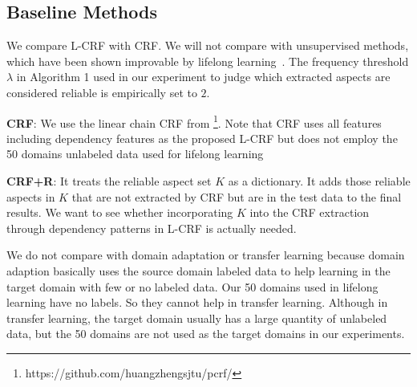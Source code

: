 \documentclass[11pt,a4paper]{article}
\theoremstyle{definition}
\begin{document}
\subsection{Baseline Methods} %
    We compare L-CRF with CRF. We will not compare with unsupervised methods, which have been shown improvable by lifelong learning~\cite{ChenZhiyuan2014ACL,liu2016improving}. The frequency threshold $\lambda$ in Algorithm 1 used in our experiment to judge which extracted aspects are considered reliable is empirically set to $2$.    
    
    {\bf CRF}: We use the linear chain CRF from  \footnote{https://github.com/huangzhengsjtu/pcrf/}. Note that CRF uses all features including dependency features as the proposed L-CRF but does not employ the 50 domains unlabeled data used for lifelong learning
    
    {\bf CRF+R}: It treats the reliable aspect set $K$ as a dictionary. It adds those reliable aspects in $K$ that are not extracted by CRF but are in the test data to the final results. We want to see whether incorporating $K$ into the CRF extraction through dependency patterns in L-CRF is actually needed.     

We do not compare with domain adaptation or transfer learning because domain adaption basically uses the source domain labeled data to help learning in the target domain with few or no labeled data. Our 50 domains used in lifelong learning have no labels. So they cannot help in transfer learning. Although in transfer learning, the target domain usually has a large quantity of unlabeled data, but the 50 domains are not used as the target domains in our experiments. 
    
\end{document}
